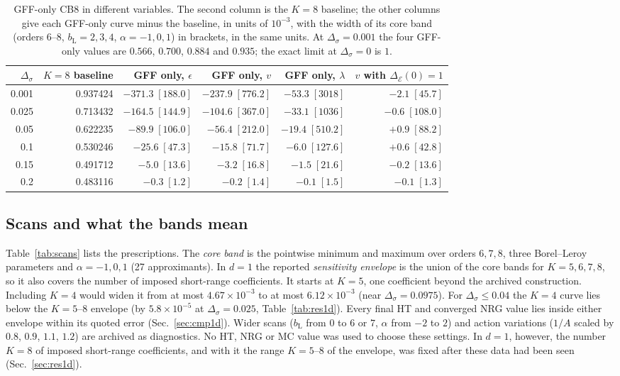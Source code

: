 \documentclass[11pt,a4paper]{article}
\numberwithin{equation}{section}
\newcommand{\De}{\Delta_{\mathcal E}}   %
\newcommand{\Ds}{\Delta_\sigma}
\newcommand{\bL}{b_{\mathrm L}}
\newcommand{\sci}[2]{#1\times10^{#2}}
\begin{document}
\begin{table}[htbp]\centering\small
\begin{tabular}{@{}r r r r r r@{}}
\toprule
$\Ds$ & $K=8$ baseline & GFF only, $\epsilon$ & GFF only, $v$ & GFF only, $\lambda$ & $v$ with $\De(0)=1$\\ \midrule
0.001 & 0.937424 & $-371.3\;[188.0]$ & $-237.9\;[776.2]$ & $-53.3\;[3018]$ & $-2.1\;[45.7]$\\
0.025 & 0.713432 & $-164.5\;[144.9]$ & $-104.6\;[367.0]$ & $-33.1\;[1036]$ & $-0.6\;[108.0]$\\
0.05 & 0.622235 & $-89.9\;[106.0]$ & $-56.4\;[212.0]$ & $-19.4\;[510.2]$ & $+0.9\;[88.2]$\\
0.1 & 0.530246 & $-25.6\;[47.3]$ & $-15.8\;[71.7]$ & $-6.0\;[127.6]$ & $+0.6\;[42.8]$\\
0.15 & 0.491712 & $-5.0\;[13.6]$ & $-3.2\;[16.8]$ & $-1.5\;[21.6]$ & $-0.2\;[13.6]$\\
0.2 & 0.483116 & $-0.3\;[1.2]$ & $-0.2\;[1.4]$ & $-0.1\;[1.5]$ & $-0.1\;[1.3]$\\
\bottomrule
\end{tabular}
\caption{GFF-only CB8 in different variables. The second column is the $K=8$ baseline; the
other columns give each GFF-only curve minus the baseline, in units of $10^{-3}$, with the
width of its core band (orders $6$--$8$, $\bL=2,3,4$, $\alpha=-1,0,1$) in brackets, in the
same units. At $\Ds=0.001$ the four GFF-only values are $0.566$,
$0.700$, $0.884$ and $0.935$; the exact limit at $\Ds=0$ is $1$.}
\label{tab:gffonly}
\end{table}

\subsection{Scans and what the bands mean}\label{sec:scans}
Table~\ref{tab:scans} lists the prescriptions. The \emph{core band} is the pointwise
minimum and maximum over orders $6,7,8$, three Borel--Leroy parameters and
$\alpha=-1,0,1$ (27 approximants). In $d=1$ the reported \emph{sensitivity envelope} is
the union of the core bands for $K=5,6,7,8$, so it also covers the number of imposed
short-range coefficients. It starts at $K=5$, one coefficient beyond the archived
construction. Including $K=4$ would widen it from at most $\sci{4.67}{-3}$ to at most
$\sci{6.12}{-3}$ (near $\Ds=0.0975$). For $\Ds\le0.04$ the $K=4$ curve lies below the
$K=5$--$8$ envelope (by $\sci{5.8}{-5}$ at $\Ds=0.025$, Table~\ref{tab:res1d}). Every final HT
and converged NRG value lies inside either envelope within its quoted error
(Sec.~\ref{sec:cmp1d}). Wider scans ($\bL$ from $0$ to $6$ or $7$, $\alpha$ from $-2$ to $2$)
and action variations ($1/A$ scaled by $0.8$, $0.9$, $1.1$, $1.2$) are archived as
diagnostics. No HT, NRG or MC value was used to choose these settings. In $d=1$, however,
the number $K=8$ of imposed short-range coefficients, and with it the range $K=5$--$8$ of the
envelope, was fixed after these data had been seen (Sec.~\ref{sec:res1d}).
\end{document}
